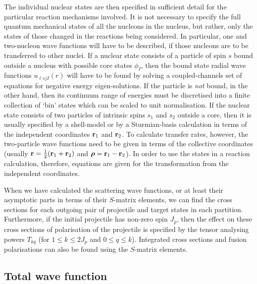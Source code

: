 \documentclass[11pt,a4paper]{article}
\newcommand{\vecr}{{\bf r}}
\newcommand{\brho}{{\mbox{\boldmath $\rho$}}}
\newcommand{\half}{\frac{1}{2}}
\begin{document}
The individual nuclear states are then specified in sufficient
detail for the particular reaction mechanisms involved. It is not
necessary to specify the full quantum mechanical states of all the
nucleons in the nucleus, but rather, only the states of those changed in the
reactions being considered. In particular, one and two-nucleon wave
functions will have to be described, if those nucleons are to be
transferred to other nuclei.  If a nuclear state consists of a particle of
spin $s$ bound outside a nucleus with possible core states
$\phi_I $, then the bound state radial wave functions
$ u_{\ell s j I} (r) $ will have to be found by solving a
coupled-channels set of equations for negative energy eigen-solutions. If
the particle is {\em not} bound, in the other hand, then its continuum range of
energies must be discretised into a finite collection of `bin'
states which can be scaled to unit normalisation.
If the nuclear state consists of two particles of intrinsic spins
$ s_1 $ and $ s_2 $ outside a core,
then it is usually specified by a
shell-model or by a Sturmian-basis calculation in terms of the independent
coordinates $ \vecr_1 $ and $ \vecr_2 $.
To calculate transfer rates, however, the two-particle wave
functions need to be given in terms of the collective coordinates
(usually $ \vecr =\half ( \vecr_1 + \vecr_2 ) $ and
$ {\brho} = \vecr_1 - \vecr_2 $).
In order to use the states in a reaction calculation, therefore, equations are given
for the transformation from the independent coordinates.

When we have calculated the scattering wave functions, or at least their
asymptotic parts in terms of their $S$-matrix elements, we can find the
cross sections for each outgoing pair of projectile and target states in
each partition. Furthermore, if the initial projectile has non-zero spin
$ J_p $, then the effect on these cross sections of polarisation
of the projectile is specified by the tensor analysing powers
$ T_{kq} $ (for $ 1 \leq k \leq 2J_p $
and $ 0 \leq q \leq k $).
Integrated cross sections and fusion polarisations can also be found using
the $S$-matrix elements.
\subsection{Total wave function}
\end{document}

